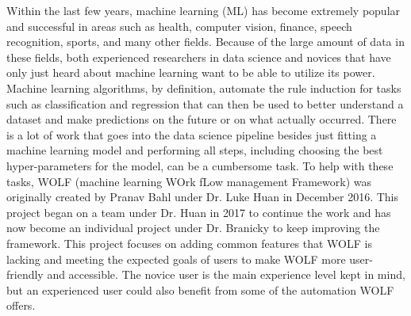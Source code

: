Within the last few years, machine learning (ML) has become extremely popular and successful in areas such as health, computer vision, finance, speech recognition, sports, and many other fields. Because of the large amount of data in these fields, both experienced researchers in data science and novices that have only just heard about machine learning want to be able to utilize its power. Machine learning algorithms, by definition, automate the rule induction for tasks such as classification and regression that can then be used to better understand a dataset and make predictions on the future or on what actually occurred. There is a lot of work that goes into the data science pipeline besides just fitting a machine learning model and performing all steps, including choosing the best hyper-parameters for the model, can be a cumbersome task. To help with these tasks, WOLF (machine learning WOrk fLow management Framework) was originally created by Pranav Bahl under Dr. Luke Huan in December 2016. This project began on a team under Dr. Huan in 2017 to continue the work and has now become an individual project under Dr. Branicky to keep improving the framework. This project focuses on adding common features that WOLF is lacking and meeting the expected goals of users to make WOLF more user-friendly and accessible. The novice user is the main experience level kept in mind, but an experienced user could also benefit from some of the automation WOLF offers.